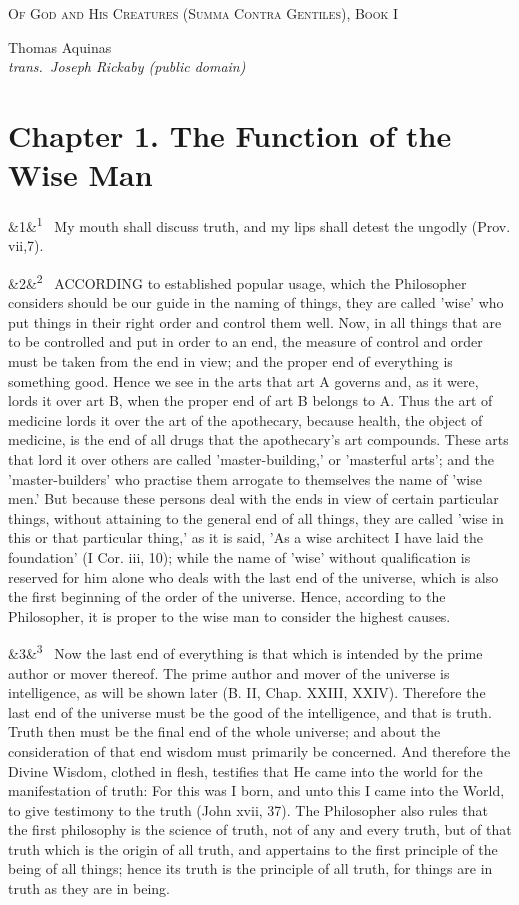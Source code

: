 \documentclass[12pt]{article}
\newcommand{\work}[1]{\begin{center}\LARGE\scshape #1\end{center}}
\newcommand{\attrib}[2]{\begin{center}\large #1\\[2pt]\small\itshape trans.\ #2\end{center}\vspace{1em}}
\newcommand{\para}[1][]{\par\noindent\ifx&#1&\else\textsuperscript{\footnotesize #1}~\fi}
\begin{document}
\work{Of God and His Creatures (Summa Contra Gentiles), Book I}

\attrib{Thomas Aquinas}{Joseph Rickaby (public domain)}

\section*{Chapter 1. The Function of the Wise Man}

\para[1] My mouth shall discuss truth, and my lips shall detest the ungodly (Prov. vii,7).

\para[2] ACCORDING to established popular usage, which the Philosopher considers should be our guide in the naming of things, they are called 'wise' who put things in their right order and control them well. Now, in all things that are to be controlled and put in order to an end, the measure of control and order must be taken from the end in view; and the proper end of everything is something good. Hence we see in the arts that art A governs and, as it were, lords it over art B, when the proper end of art B belongs to A. Thus the art of medicine lords it over the art of the apothecary, because health, the object of medicine, is the end of all drugs that the apothecary's art compounds. These arts that lord it over others are called 'master-building,' or 'masterful arts'; and the 'master-builders' who practise them arrogate to themselves the name of 'wise men.' But because these persons deal with the ends in view of certain particular things, without attaining to the general end of all things, they are called 'wise in this or that particular thing,' as it is said, 'As a wise architect I have laid the foundation' (I Cor. iii, 10); while the name of 'wise' without qualification is reserved for him alone who deals with the last end of the universe, which is also the first beginning of the order of the universe. Hence, according to the Philosopher, it is proper to the wise man to consider the highest causes.

\para[3] Now the last end of everything is that which is intended by the prime author or mover thereof. The prime author and mover of the universe is intelligence, as will be shown later (B. II, Chap. XXIII, XXIV). Therefore the last end of the universe must be the good of the intelligence, and that is truth. Truth then must be the final end of the whole universe; and about the consideration of that end wisdom must primarily be concerned. And therefore the Divine Wisdom, clothed in flesh, testifies that He came into the world for the manifestation of truth: For this was I born, and unto this I came into the World, to give testimony to the truth (John xvii, 37). The Philosopher also rules that the first philosophy is the science of truth, not of any and every truth, but of that truth which is the origin of all truth, and appertains to the first principle of the being of all things; hence its truth is the principle of all truth, for things are in truth as they are in being.
\end{document}
